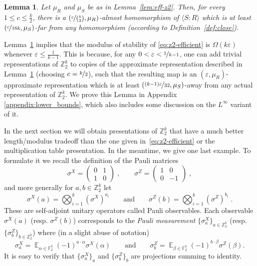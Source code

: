\documentclass[11pt]{article}
\newtheorem{lemma}[theorem]{Lemma}
\theoremstyle{definition}
\DeclareMathOperator*{\Expectation}{\mathbb{E}}
\newcommand{\Es}[1]{\Expectation_{#1}}
\newcommand{\F}{\ensuremath{\mathbb{F}}}
\newcommand{\Z}{\ensuremath{\mathbb{Z}}}
\newcommand{\eps}{\varepsilon}
\begin{document}
\begin{lemma}\label{lem:lower_bound_on_stability_rate_standard_presentation_Z_2^k}
    Let $\mu_R$ and $\mu_S$ be as in Lemma~\ref{lem:eff-z2}. %
    Then, for every $1\leq c\leq \frac{k}{2}$, there is a $(\nicefrac{c}{\binom{k}{2}},\mu_R)$-almost homomorphism of $\langle S\colon R\rangle$ which is at least  $(\nicefrac{c}{16k},\mu_S)$-far from any homomorphism (according to Definition~\ref{def:close}). 
\end{lemma}


Lemma~\ref{lem:lower_bound_on_stability_rate_standard_presentation_Z_2^k} implies that the modulus of stability of \eqref{eq:z2-efficient} is $\Omega(k\eps)$ whenever $\eps\leq\frac{1}{k-1}$. This is because, for any $0<\eps<\nicefrac{1}{k-1}$, one can add trivial representations of $\Z_2^k$ to copies of the approximate representation described in Lemma~\ref{lem:lower_bound_on_stability_rate_standard_presentation_Z_2^k} (choosing $c=\nicefrac{k}{2}$), such that the resulting map is an $(\eps,\mu_R)$-approximate representation which is at least $(\nicefrac{(k-1)\eps}{32},\mu_S)$-away from any actual representation of $\Z_2^k$. We prove this Lemma in Appendix \ref{appendix:lower_bounds}, which also includes some discussion on the $L^\infty$ variant of it. 


In the next section we will obtain presentations of $\Z_2^k$ that have a much better length/modulus tradeoff than the one given in~\eqref{eq:z2-efficient} or the multiplication table presentation. In the meantime, we give one last example. To formulate it we recall the definition of the Pauli matrices
	\begin{equation}\label{eq:def-pauli-1} \sigma^X = \begin{pmatrix} 0 & 1 \\ 1 & 0 \end{pmatrix}\;,\qquad \sigma^Z = \begin{pmatrix} 1 & 0 \\ 0 & -1\end{pmatrix}\;,
	\end{equation}
	and more generally for $a,b\in \Z_2^k$ let 
	\begin{equation}\label{eq:def-pauli-2}
	\sigma^X(a) = \bigotimes_{i=1}^k (\sigma^X)^{a_i}\qquad\text{and}\qquad\sigma^Z(b) = \bigotimes_{i=1}^k (\sigma^Z)^{b_i}\;.
	\end{equation}
These are self-adjoint unitary operators called Pauli observables. Each observable $\sigma^X(a)$ (resp. $\sigma^Z(b)$) corresponds to the \emph{Pauli measurement} $\{ \sigma^X_a \}_{a \in \Z_2^k}$ (resp. $\{ \sigma^Z_b \}_{b \in \Z_2^k}$) where (in a slight abuse of notation)  
	\[    \sigma^X_a = \Es{\alpha\in\F_2^k} (-1)^{a\cdot \alpha} \sigma^X(\alpha)\qquad\text{and}\qquad\sigma^Z_b = \Es{\beta\in\F_2^k} (-1)^{b\cdot\beta} \sigma^Z(\beta).\]
	It is easy to verify that $\{\sigma^X_a\}_a$ and $\{\sigma^Z_b\}_b$ are projections summing to identity.	
	
\end{document}
